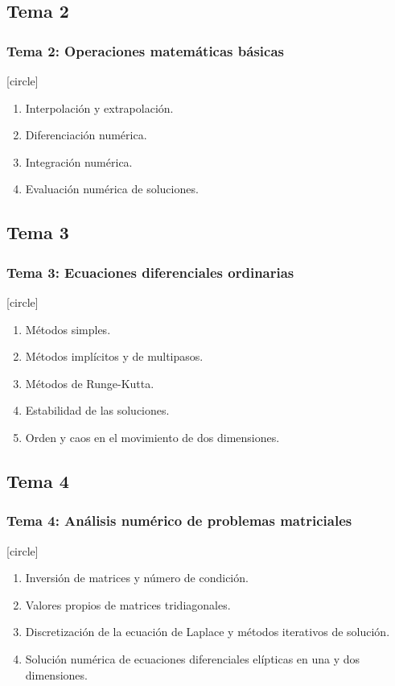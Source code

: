 \subsection*{Tema 2}
\begin{frame}
\frametitle{\textbf{Tema 2: Operaciones matemáticas básicas}}
[circle]
\begin{enumerate}[<+->]
\item Interpolación y extrapolación.
\item Diferenciación numérica.
\item Integración numérica.
\item Evaluación numérica de soluciones.
\end{enumerate}
\end{frame}
\subsection*{Tema 3}
\begin{frame}
\frametitle{\textbf{Tema 3: Ecuaciones diferenciales ordinarias}}
[circle]
\begin{enumerate}[<+->]
\item Métodos simples.
\item Métodos implícitos y de multipasos.
\item Métodos de Runge-Kutta.
\item Estabilidad de las soluciones.
\item Orden y caos en el movimiento de dos dimensiones.
\end{enumerate}
\end{frame}
\subsection*{Tema 4}
\begin{frame}
\frametitle{\textbf{Tema 4: Análisis numérico de problemas matriciales}}
[circle]
\begin{enumerate}[<+->]
\item Inversión de matrices y número de condición.
\item Valores propios de matrices tridiagonales.
\item Discretización de la ecuación de Laplace y métodos iterativos de solución.
\item Solución numérica de ecuaciones diferenciales elípticas en una y dos dimensiones.
\end{enumerate}
\end{frame}
